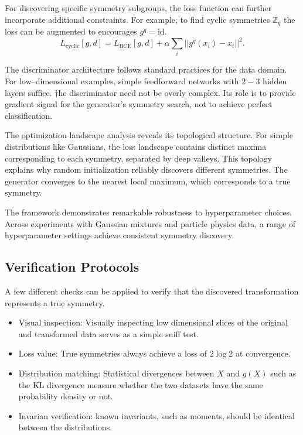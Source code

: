     For discovering specific symmetry subgroups, the loss function can further incorporate additional constraints.
    For example, to find cyclic symmetries \(\mathbb{Z}_q\) the loss can be augmented to encourages \(g^q = \text{id}\).
    \[
        \label{eq:cyclic-loss}
        L_{\text{cyclic}}[g,d] = L_{\text{BCE}}[g,d] + \alpha \sum_{i} ||g^q(x_i) - x_i||^2.
    \]

    The discriminator architecture follows standard practices for the data domain.
    For low--dimensional examples, simple feedforward networks with \(2-3\) hidden layers suffice.
    †he discriminator need not be overly complex.
    Its role is to provide gradient signal for the generator's symmetry search, not to achieve perfect classification.

    The optimization landscape analysis reveals its topological structure.
    For simple distributions like Gaussians, the loss landscape contains distinct maxima corresponding to each symmetry, separated by deep valleys.
    This topology explains why random initialization reliably discovers different symmetries.
    The generator converges to the nearest local maximum, which corresponds to a true symmetry.

    The framework demonstrates remarkable robustness to hyperparameter choices.
    Across experiments with Gaussian mixtures and particle physics data, a range of hyperparameter settings achieve consistent symmetry discovery.

    \subsection{Verification Protocols}
    A few different checks can be applied to verify that the discovered transformation represents a true symmetry.
    \begin{itemize}
        \item Visual inspection: Visually inspecting low dimensional slices of the original and transformed data serves as a simple sniff test.
        \item Loss value: True symmetries always achieve a loss of \(2\log2\) at convergence.
        \item Distribution matching: Statistical divergences between \(X\) and \(g(X)\) such as the KL divergence measure whether the two datasets have the same probability density or not.
        \item Invarian verification: known invariants, such as moments, should be identical between the distributions.
    \end{itemize}
    
